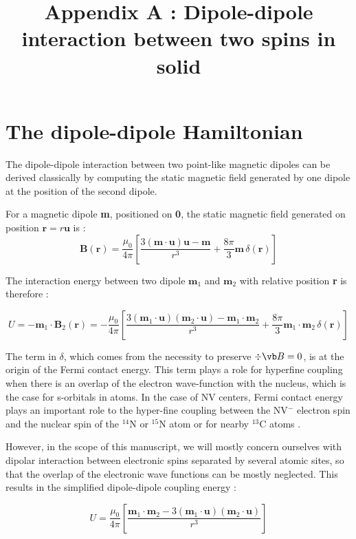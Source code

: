 \documentclass[a4paper]{book}
\title{Appendix A : Dipole-dipole interaction between two spins in solid}
\begin{document}
\section{The dipole-dipole Hamiltonian}
The dipole-dipole interaction between two point-like magnetic dipoles can be derived classically by computing the static magnetic field generated by one dipole at the position of the second dipole.

For a magnetic dipole \textbf{m}, positioned on \textbf{0}, the static magnetic field generated on position $\mathbf{r}=r\mathbf{u}$ is : \cite[p.~188]{jackson1999classical} 
\begin{equation}
\mathbf{B}(\mathbf{r})=\frac{\mu_0}{4 \pi}\left[ \frac{3 (\mathbf{m}\cdot\mathbf{u})\mathbf{u} - \mathbf{m}}{r^3}+\frac{8\pi}{3}\mathbf{m}\,\delta(\mathbf{r})\right]
\end{equation}

The interaction energy between two dipole $\mathbf{m}_1$ and $\mathbf{m}_2$ with relative position \textbf{r} is therefore :

\begin{equation}
U=-\mathbf{m}_1 \cdot \mathbf{B}_2(\mathbf{r})=-\frac{\mu_0}{4 \pi}\left[ \frac{3 (\mathbf{m}_1\cdot\mathbf{u})(\mathbf{m}_2\cdot\mathbf{u}) - \mathbf{m}_1\cdot\mathbf{m}_2}{r^3}+\frac{8\pi}{3}\mathbf{m}_1\cdot\mathbf{m}_2\,\delta(\mathbf{r})\right]
\end{equation}

The term in $\delta$, which comes from the necessity to preserve $\div{\vb B}=0$, is at the origin of the Fermi contact energy. This term plays a role for hyperfine coupling when there is an overlap of the electron wave-function with the nucleus, which is the case for s-orbitals in atoms. In the case of NV centers, Fermi contact energy plays an important role to the hyper-fine coupling between the NV$^-$ electron spin and the nuclear spin of the $^{14}$N or $^{15}$N atom \cite{doherty2012theory} or for nearby $^{13}$C atoms \cite{smeltzer201113c}.

However, in the scope of this manuscript, we will mostly concern ourselves with dipolar interaction between electronic spins separated by several atomic sites, so that the overlap of the electronic wave functions can be mostly neglected. This results in the simplified dipole-dipole coupling energy :

\begin{equation}
\label{eq_dipole_dipole_classical}
U=\frac{\mu_0}{4 \pi}\left[ \frac{ \mathbf{m}_1\cdot\mathbf{m}_2 - 3 (\mathbf{m}_1\cdot\mathbf{u})(\mathbf{m}_2\cdot\mathbf{u})}{r^3}\right]
\end{equation}
\end{document}

